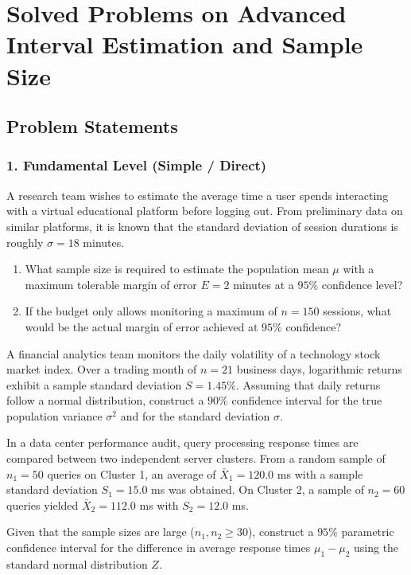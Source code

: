 \section{Solved Problems on Advanced Interval Estimation and Sample Size}

\subsection{Problem Statements}

\subsubsection*{1. Fundamental Level (Simple / Direct)}

\begin{problema}
	\label{prob:n_media}
	A research team wishes to estimate the average time a user spends interacting with a virtual educational platform before logging out. From preliminary data on similar platforms, it is known that the standard deviation of session durations is roughly $\sigma = 18$ minutes.
	\begin{enumerate}
		\item What sample size is required to estimate the population mean $\mu$ with a maximum tolerable margin of error $E = 2$ minutes at a $95\%$ confidence level?
		\item If the budget only allows monitoring a maximum of $n = 150$ sessions, what would be the actual margin of error achieved at $95\%$ confidence?
	\end{enumerate}
\end{problema}

\begin{problema}
	\label{prob:ic_varianza}
	A financial analytics team monitors the daily volatility of a technology stock market index. Over a trading month of $n = 21$ business days, logarithmic returns exhibit a sample standard deviation $S = 1.45\%$. Assuming that daily returns follow a normal distribution, construct a $90\%$ confidence interval for the true population variance $\sigma^2$ and for the standard deviation $\sigma$.
\end{problema}

\begin{problema}
	\label{prob:dif_medias_z_avanzado}
	In a data center performance audit, query processing response times are compared between two independent server clusters. From a random sample of $n_1 = 50$ queries on Cluster 1, an average of $\bar{X}_1 = 120.0$ ms with a sample standard deviation $S_1 = 15.0$ ms was obtained. On Cluster 2, a sample of $n_2 = 60$ queries yielded $\bar{X}_2 = 112.0$ ms with $S_2 = 12.0$ ms.
	
	Given that the sample sizes are large ($n_1, n_2 \ge 30$), construct a $95\%$ parametric confidence interval for the difference in average response times $\mu_1 - \mu_2$ using the standard normal distribution $Z$.
\end{problema}

